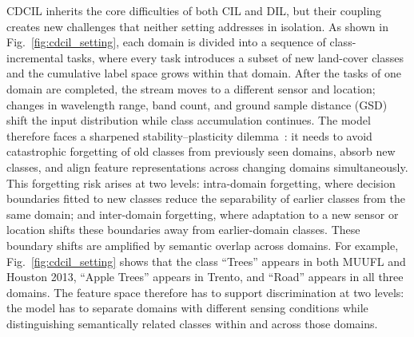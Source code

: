 CDCIL inherits the core difficulties of both CIL and DIL, but their coupling creates new challenges that neither setting addresses in isolation.
As shown in Fig.~\ref{fig:cdcil_setting}, each domain is divided into a sequence of class-incremental tasks, where every task introduces a subset of new land-cover classes and the cumulative label space grows within that domain.
After the tasks of one domain are completed, the stream moves to a different sensor and location; changes in wavelength range, band count, and ground sample distance (GSD) shift the input distribution while class accumulation continues.
The model therefore faces a sharpened stability--plasticity dilemma~\cite{mermillod2013stability}: it needs to avoid catastrophic forgetting of old classes from previously seen domains, absorb new classes, and align feature representations across changing domains simultaneously.
This forgetting risk arises at two levels: intra-domain forgetting, where decision boundaries fitted to new classes reduce the separability of earlier classes from the same domain; and inter-domain forgetting, where adaptation to a new sensor or location shifts these boundaries away from earlier-domain classes.
These boundary shifts are amplified by semantic overlap across domains.
For example, Fig.~\ref{fig:cdcil_setting} shows that the class ``Trees'' appears in both MUUFL and Houston 2013, ``Apple Trees'' appears in Trento, and ``Road'' appears in all three domains.
The feature space therefore has to support discrimination at two levels: the model has to separate domains with different sensing conditions while distinguishing semantically related classes within and across those domains.

